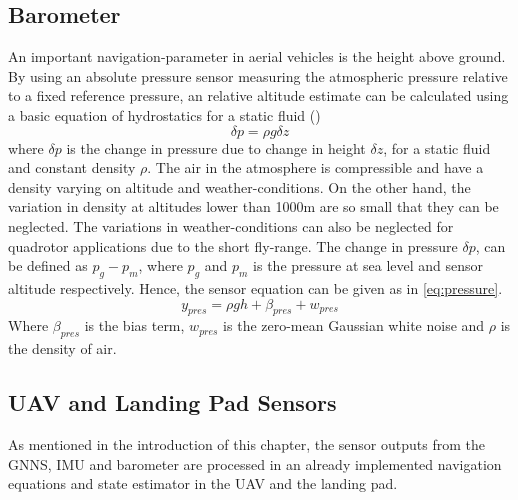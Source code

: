 \subsection{Barometer}\label{sec:baromter}
An important navigation-parameter in aerial vehicles is the height above ground. By using an absolute pressure sensor measuring the atmospheric pressure relative to a fixed reference pressure, an relative altitude estimate can be calculated using a basic equation of hydrostatics for a static fluid (\cite{beard2012small})
\begin{equation}
  \delta p = \rho g \delta z
\end{equation}
where $\delta p$ is the change in pressure due to change in height $\delta z$, for a static fluid and constant density $\rho$. The air in the atmosphere is compressible and have a density varying on altitude and weather-conditions. 
On the other hand, the variation in density at altitudes lower than 1000m are so small that they can be neglected. The variations in weather-conditions can also be neglected for quadrotor applications due to the short fly-range.
The change in pressure $\delta p$, can be defined as $p_g - p_m$, where $p_g$ and $p_m$ is the pressure at sea level and sensor altitude respectively. Hence, the sensor equation can be given as in \ref{eq:pressure}.
\begin{equation}\label{eq:pressure}
  y_{pres}=\rho g h + \beta_{pres}+w_{pres}
\end{equation}
Where $\beta_{pres}$ is the bias term, $w_{pres}$ is the zero-mean Gaussian white noise and $\rho$ is the density of air.


\subsection{UAV and Landing Pad Sensors}\label{sub:UAVSensors}
As mentioned in the introduction of this chapter, the sensor outputs from the GNNS, IMU and barometer are processed in an already implemented navigation equations and state estimator in the UAV and the landing pad.

